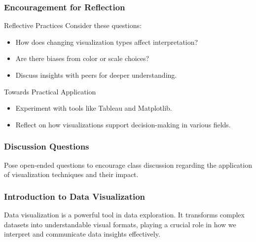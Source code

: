 \documentclass[aspectratio=169]{beamer}
\begin{document}
\begin{frame}[fragile]
    \frametitle{Encouragement for Reflection}
    \begin{block}{Reflective Practices}
        Consider these questions:
        \begin{itemize}
            \item How does changing visualization types affect interpretation?
            \item Are there biases from color or scale choices?
            \item Discuss insights with peers for deeper understanding.
        \end{itemize}
    \end{block}
    
    \begin{block}{Towards Practical Application}
        \begin{itemize}
            \item Experiment with tools like Tableau and Matplotlib.
            \item Reflect on how visualizations support decision-making in various fields.
        \end{itemize}
    \end{block}
\end{frame}

\begin{frame}[fragile]
  \frametitle{Discussion Questions}
  Pose open-ended questions to encourage class discussion regarding the application of visualization techniques and their impact.
\end{frame}

\begin{frame}[fragile]
  \frametitle{Introduction to Data Visualization}
  Data visualization is a powerful tool in data exploration. It transforms complex datasets into understandable visual formats, playing a crucial role in how we interpret and communicate data insights effectively.
\end{frame}
\end{document}

